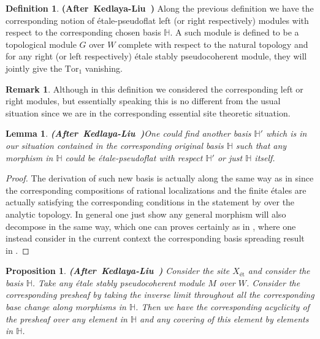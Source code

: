 \documentclass[12pt]{amsart}
\newtheorem{lemma}[theorem]{Lemma}
\newtheorem{proposition}[theorem]{Proposition}
\theoremstyle{definition}
\newtheorem{definition}[theorem]{Definition}
\newtheorem{remark}[theorem]{Remark}
\numberwithin{equation}{section}
\begin{document}
\begin{definition} \mbox{\bf{(After Kedlaya-Liu \cite[Definition 2.5.9]{KL2})}}
Along the previous definition we have the corresponding notion of \'etale-pseudoflat left (or right respectively) modules with respect to the corresponding chosen basis $\mathbb{H}$. A such module is defined to be a topological module $G$ over $W$ complete with respect to the natural topology and for any right (or left respectively) \'etale stably pseudocoherent module, they will jointly give the $\mathrm{Tor}_1$ vanishing.
\end{definition}


\begin{remark}
Although in this definition we considered the corresponding left or right modules, but essentially speaking this is no different from the usual situation since we are in the corresponding essential site theoretic situation.	
\end{remark}





\begin{lemma}\mbox{\bf{(After Kedlaya-Liu \cite[Lemma 2.5.10]{KL2})}}\label{lemma4.4}
One could find another basis $\mathbb{H}'$ which is in our situation contained in the corresponding original basis $\mathbb{H}$ such that any morphism in $\mathbb{H}$ could be \'etale-pseudoflat with respect $\mathbb{H}'$ or just $\mathbb{H}$ itself.	
\end{lemma}


\begin{proof}
The derivation of such new basis is actually along the same way as in \cite[Lemma 2.5.10]{KL2} since the corresponding compositions of rational localizations and the finite \'etales are actually satisfying the corresponding conditions in the statement by \cite[Theorem 2.12]{TX2} over the analytic topology. In general one just show any general morphism will also decompose in the same way, which one can proves certainly as in \cite[Lemma 2.5.10]{KL2}, where one instead consider in the current context the corresponding basis spreading result in \cite[Lemma 1.10.4]{Ked1}. 
\end{proof}



\begin{proposition} \mbox{\bf{(After Kedlaya-Liu \cite[Theorem 2.5.11]{KL2})}}
Consider the site $X_\text{\'et}$ and consider the basis $\mathbb{H}$. Take any \'etale stably pseudocoherent module $M$ over $W$. Consider the corresponding presheaf by taking the inverse limit throughout all the corresponding base change along morphisms in $\mathbb{H}$. Then we have the corresponding acyclicity of the presheaf over any element in $\mathbb{H}$ and any covering of this element by elements in $\mathbb{H}$.	
\end{proposition}
\end{document}
